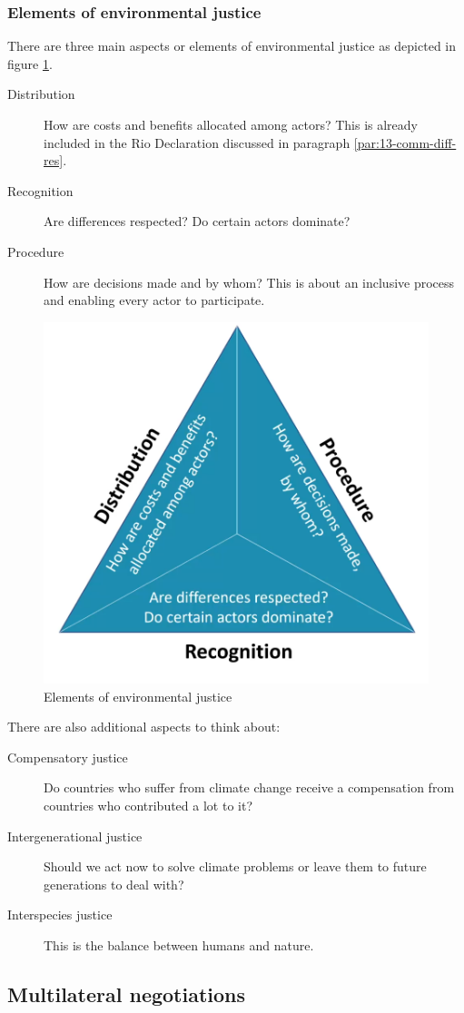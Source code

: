 \documentclass[../summary.tex]{subfiles}
\begin{document}
		\subsubsection{Elements of environmental justice}
			There are three main aspects or elements of environmental justice as depicted in figure \ref{fig:13-elements-of-justice}.
			\begin{description}
				\item[Distribution] How are costs and benefits allocated among actors? This is already included in the Rio Declaration discussed in paragraph \ref{par:13-comm-diff-res}.
				\item[Recognition] Are differences respected? Do certain actors dominate?
				\item[Procedure] How are decisions made and by whom? This is about an inclusive process and enabling every actor to participate.
			\end{description}
			\begin{figure}[h]
				\centering
				\includegraphics[width=0.5\linewidth]{../images/13-elements-of-justice.png}
				\caption{Elements of environmental justice}
				\label{fig:13-elements-of-justice}
			\end{figure}
			There are also additional  aspects to think about:
			\begin{description}
				\item[Compensatory justice] Do countries who suffer from climate change receive a compensation from countries who contributed a lot to it?
				\item[Intergenerational justice] Should we act now to solve climate problems or leave them to future generations to deal with?
				\item[Interspecies justice] This is the balance between humans and nature. 
			\end{description}
			
			
	\subsection{Multilateral negotiations}
\end{document}
